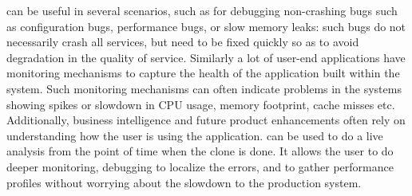  \parikshan can be useful in several scenarios, such as for debugging non-crashing bugs such as configuration bugs, performance bugs, or slow memory leaks: such bugs do not necessarily crash all services, but need to be fixed quickly so as to avoid degradation in the quality of service.
Similarly a lot of user-end applications have monitoring mechanisms to capture the health of the application built within the system.
Such monitoring mechanisms can often indicate problems in the systems showing spikes or slowdown in CPU usage, memory footprint, cache misses etc.
Additionally, business intelligence and future product enhancements often rely on understanding how the user is using the application.
\parikshan can be used to do a live analysis from the point of time when the clone is done. It allows the user to do deeper monitoring, debugging to localize the errors, and to gather performance profiles without worrying about the slowdown to the production system.

